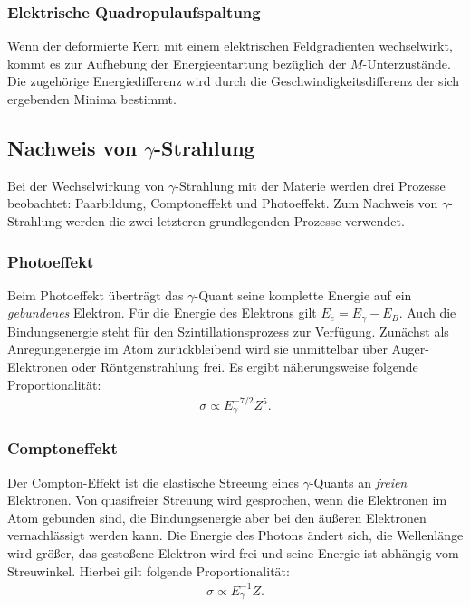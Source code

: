 \documentclass[a4paper,twoside,final]{article}
\begin{document}
\subsubsection{Elektrische Quadropulaufspaltung}
Wenn der deformierte Kern mit einem elektrischen Feldgradienten wechselwirkt, kommt es zur Aufhebung der Energieentartung bezüglich der $M$-Unterzustände. Die zugehörige Energiedifferenz wird durch die Geschwindigkeitsdifferenz der sich ergebenden Minima bestimmt.

\subsection{Nachweis von $\gamma$-Strahlung}
Bei der Wechselwirkung von $\gamma$-Strahlung mit der Materie werden drei Prozesse beobachtet: Paarbildung, Comptoneffekt und Photoeffekt. Zum Nachweis von $\gamma$-Strahlung werden die zwei letzteren grundlegenden Prozesse verwendet.
\subsubsection{Photoeffekt}
Beim Photoeffekt überträgt das $\gamma$-Quant seine komplette Energie auf ein \textit{gebundenes} Elektron. Für die Energie des Elektrons gilt $E_e = E_\gamma - E_B$. Auch die Bindungsenergie steht für den Szintillationsprozess zur Verfügung. Zunächst als Anregungenergie im Atom zurückbleibend wird sie unmittelbar über Auger-Elektronen oder Röntgenstrahlung frei. Es ergibt näherungsweise folgende Proportionalität:
\begin{align}
\sigma  \propto E_{\gamma} ^{-7/2} Z^5.
\end{align}
\subsubsection{Comptoneffekt}
Der Compton-Effekt ist die elastische Streeung eines $\gamma$-Quants an \textit{freien} Elektronen. Von quasifreier Streuung wird gesprochen, wenn die Elektronen im Atom gebunden sind, die Bindungsenergie aber bei den äußeren Elektronen vernachlässigt werden kann. Die Energie des Photons ändert sich, die Wellenlänge wird größer, das gestoßene Elektron wird frei und seine Energie ist abhängig vom Streuwinkel. Hierbei gilt folgende Proportionalität:
\begin{align}
\sigma \propto E_{\gamma}^{-1} Z.
\end{align}
\end{document}
